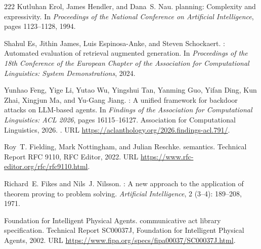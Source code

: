 \begin{thebibliography}{222}
Kutluhan Erol, James Hendler, and Dana~S. Nau.
 planning: Complexity and expressivity.
\newblock In \emph{Proceedings of the National Conference on Artificial
  Intelligence}, pages 1123--1128, 1994.

Shahul Es, Jithin James, Luis Espinosa-Anke, and Steven Schockaert.
: Automated evaluation of retrieval augmented generation.
\newblock In \emph{Proceedings of the 18th Conference of the European Chapter
  of the Association for Computational Linguistics: System Demonstrations},
  2024.

Yunhao Feng, Yige Li, Yutao Wu, Yingshui Tan, Yanming Guo, Yifan Ding, Kun
  Zhai, Xingjun Ma, and Yu-Gang Jiang.
: A unified framework for backdoor attacks on
  {LLM}-based agents.
\newblock In \emph{Findings of the Association for Computational Linguistics:
  ACL 2026}, pages 16115--16127. Association for Computational Linguistics,
  2026.
\newblock {}.
\newblock URL \url{https://aclanthology.org/2026.findings-acl.791/}.

Roy~T. Fielding, Mark Nottingham, and Julian Reschke.
 semantics.
\newblock Technical Report RFC 9110, RFC Editor, 2022.
\newblock URL \url{https://www.rfc-editor.org/rfc/rfc9110.html}.

Richard~E. Fikes and Nils~J. Nilsson.
: A new approach to the application of theorem proving to
  problem solving.
\newblock \emph{Artificial Intelligence}, 2 (3--4): 189--208,
  1971.

{Foundation for Intelligent Physical Agents}.
 communicative act library specification.
\newblock Technical Report SC00037J, Foundation for Intelligent Physical
  Agents, 2002.
\newblock URL \url{https://www.fipa.org/specs/fipa00037/SC00037J.html}.


\end{thebibliography}
